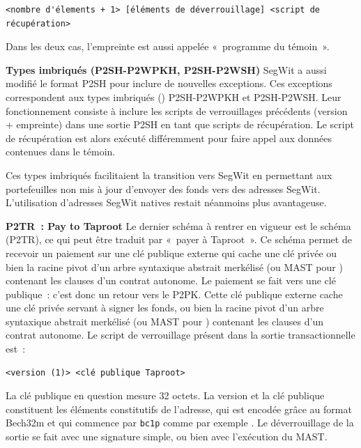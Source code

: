 \begin{Verbatim}[fontsize=\footnotesize]
<nombre d'élements + 1> [éléments de déverrouillage] <script de récupération>
\end{Verbatim}

Dans les deux cas, l'empreinte est aussi appelée «~programme du témoin~».

\textbf{Types imbriqués (P2SH-P2WPKH, P2SH-P2WSH)} SegWit a aussi modifié le format P2SH pour inclure de nouvelles exceptions. Ces exceptions correspondent aux types imbriqués () P2SH-P2WPKH et P2SH-P2WSH. Leur fonctionnement consiste à inclure les scripts de verrouillages précédents (version + empreinte) dans une sortie P2SH en tant que scripts de récupération. Le script de récupération est alors exécuté différemment pour faire appel aux données contenues dans le témoin.

Ces types imbriqués facilitaient la transition vers SegWit en permettant aux portefeuilles non mis à jour d'envoyer des fonds vers des adresses SegWit. L'utilisation d'adresses SegWit natives restait néanmoins plus avantageuse.

\textbf{P2TR~: Pay to Taproot} Le dernier schéma à rentrer en vigueur est le schéma  (P2TR), ce qui peut être traduit par «~payer à Taproot~». Ce schéma permet de recevoir un paiement sur une clé publique externe qui cache une clé privée ou bien la racine pivot d'un arbre syntaxique abstrait merkélisé (ou MAST pour ) contenant les clauses d'un contrat autonome. Le paiement se fait vers une clé publique~: c'est donc un retour vers le P2PK. Cette clé publique externe cache une clé privée servant à signer les fonds, ou bien la racine pivot d'un arbre syntaxique abstrait merkélisé (ou MAST pour ) contenant les clauses d'un contrat autonome. Le script de verrouillage présent dans la sortie transactionnelle est~:

\begin{Verbatim}[fontsize=\footnotesize]
<version (1)> <clé publique Taproot>
\end{Verbatim}

La clé publique en question mesure 32 octets. La version et la clé publique constituent les éléments constitutifs de l'adresse, qui est encodée grâce au format Bech32m et qui commence par \texttt{bc1p} comme par exemple . Le déverrouillage de la sortie se fait avec une signature simple, ou bien avec l'exécution du MAST.

